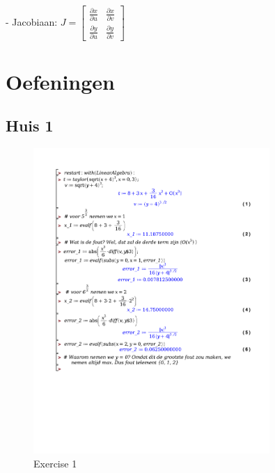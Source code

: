 \documentclass[a4paper]{article}
\begin{document}
- Jacobiaan: $J = \begin{bmatrix} \frac{\partial x}{\partial u} & \frac{\partial x}{\partial v} \\ \frac{\partial y}{\partial u} & \frac{\partial y}{\partial v} \end{bmatrix}$

\section*{Oefeningen}

\subsection*{Huis 1}

\begin{figure}[!htbp]
	\centering
	\includegraphics[width=0.8\textwidth]{./exercises/huis_1_ex_1.pdf}
	\caption{Exercise 1}
\end{figure}
\end{document}
